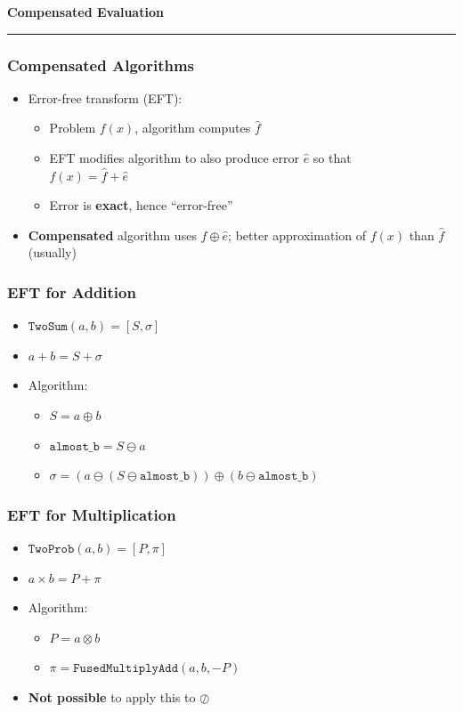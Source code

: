 \documentclass{beamer}
\begin{document}

\begin{frame}
\centering
{\Large \bf Compensated Evaluation}
\rule{0.82\textwidth}{1pt}
\end{frame}

\begin{frame}
\frametitle{Compensated Algorithms}
\begin{itemize}
\item Error-free transform (EFT):
\begin{itemize}
\pause
\item Problem \(f(x)\), algorithm computes \(\widehat{f}\)
\pause
\item EFT modifies algorithm to also produce error \(\widehat{e}\)
  so that \\ \(f(x) = \widehat{f} + \widehat{e}\)
\pause
\item Error is \textbf{exact}, hence ``error-free''
\end{itemize}
\pause
\item \textbf{Compensated} algorithm uses \(\widehat{f} \oplus \widehat{e}\);
  better approximation of \(f(x)\) than \(\widehat{f}\) (usually)
\end{itemize}
\end{frame}

\begin{frame}
\frametitle{EFT for Addition}
\begin{itemize}
\item \(\mathtt{TwoSum}(a, b) = \left[S, \sigma\right]\)
\pause
\item \(a + b = S + \sigma\)
\pause
\item Algorithm:
\begin{itemize}
\pause
\item \(S = a \oplus b\)
\pause
\item \(\mathtt{almost\_b} = S \ominus a\)
\pause
\item \(\sigma = (a \ominus (S \ominus \mathtt{almost\_b}))
  \oplus (b \ominus \mathtt{almost\_b})\)
\end{itemize}
\end{itemize}
\end{frame}

\begin{frame}
\frametitle{EFT for Multiplication}
\begin{itemize}
\item \(\mathtt{TwoProb}(a, b) = \left[P, \pi\right]\)
\pause
\item \(a \times b = P + \pi\)
\pause
\item Algorithm:
\begin{itemize}
\pause
\item \(P = a \otimes b\)
\pause
\item \(\pi = \mathtt{FusedMultiplyAdd}(a, b, -P)\)
\end{itemize}
\pause
\item \textbf{Not possible} to apply this to \(\oslash\)
\end{itemize}
\end{frame}
\end{document}
